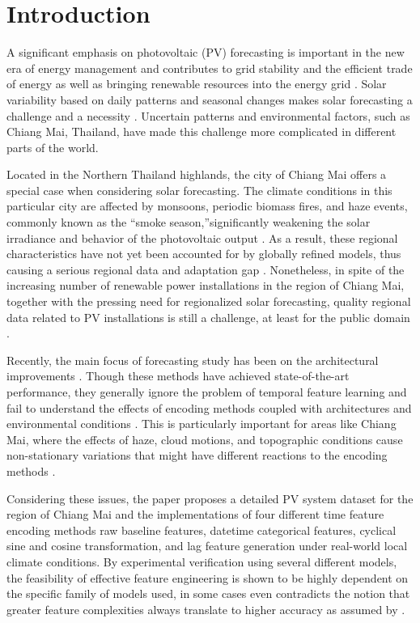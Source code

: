\documentclass[conference]{IEEEtran}
\begin{document}
	\section{Introduction}
	A significant emphasis on photovoltaic (PV) forecasting is important in the new era of energy management and contributes to grid stability and the efficient trade of energy as well as bringing renewable resources into the energy grid \cite{Ahmed2020}. Solar variability based on daily patterns and seasonal changes makes solar forecasting a challenge and a necessity \cite{Antonanzas2016}. Uncertain patterns and environmental factors, such as Chiang Mai, Thailand, have made this challenge more complicated in different parts of the world.
	
	Located in the Northern Thailand highlands, the city of Chiang Mai offers a special case when considering solar forecasting. The climate conditions in this particular city are affected by monsoons, periodic biomass fires, and haze events, commonly known as the ``smoke season,''significantly weakening the solar irradiance and behavior of the photovoltaic output \cite{Amnuaylojaroen2020}. As a result, these regional characteristics have not yet been accounted for by globally refined models, thus causing a serious regional data and adaptation gap \cite{Seng2021}. Nonetheless, in spite of the increasing number of renewable power installations in the region of Chiang Mai, together with the pressing need for regionalized solar forecasting, quality regional data related to PV installations is still a challenge, at least for the public domain \cite{ASEAN2022}.
	
	Recently, the main focus of forecasting study has been on the architectural improvements \cite{Wang2022}. Though these methods have achieved state-of-the-art performance, they generally ignore the problem of temporal feature learning and fail to understand the effects of encoding methods coupled with architectures and environmental conditions \cite{Cerqueira2020}. This is particularly important for areas like Chiang Mai, where the effects of haze, cloud motions, and topographic conditions cause non-stationary variations that might have different reactions to the encoding methods \cite{Prasertsan2021}.
	
	Considering these issues, the paper proposes a detailed PV system dataset for the region of Chiang Mai and the implementations of four different time feature encoding methods raw baseline features, datetime categorical features, cyclical sine and cosine transformation, and lag feature generation under real-world local climate conditions. By experimental verification using several different models, the feasibility of effective feature engineering is shown to be highly dependent on the specific family of models used, in some cases even contradicts the notion that greater feature complexities always translate to higher accuracy as assumed by \cite{Bommes2021}.
	
\end{document}
